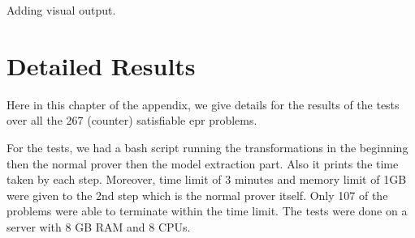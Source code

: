 Adding visual output.



\chapter{Detailed Results}\label{chap:appendix_res}


Here in this chapter of the appendix, we give details for the results of the tests over all the 267 (counter) satisfiable \ac{epr} problems.


For the tests, we had a bash script running the transformations in the beginning then the normal prover then the model extraction part. Also it prints the time taken by each step. Moreover, time limit of 3 minutes and memory limit of 1GB were given to the 2nd step which is the normal prover itself. Only 107 of the problems were able to terminate within the time limit. The tests were done on a server with 8 GB RAM and 8 CPUs.


